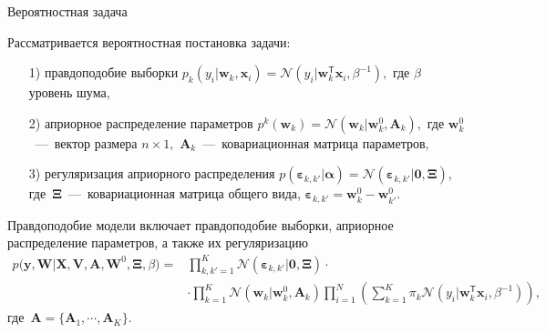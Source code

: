 \documentclass[10pt,pdf,hyperref={unicode}]{beamer}
\begin{document}
\begin{frame}{Вероятностная задача}
\justifying

Рассматривается вероятностная постановка задачи:
\begin{enumerate}
	\item[1)] правдоподобие выборки $p_{k}\left(y_{i}|\mathbf{w}_{k}, \mathbf{x}_{i}\right) = \mathcal{N}\left(y_{i}|\mathbf{w}_{k}^{\mathsf{T}}\mathbf{x}_{i}, \beta^{-1}\right),$ где $\beta$ уровень шума,
	\item[2)] априорное распределение параметров $p^{k}\left(\mathbf{w}_{k}\right) = \mathcal{N}\left(\mathbf{w}_{k}|\mathbf{w}^{0}_{k}, \mathbf{A}_{k}\right),$ где $\mathbf{w}^{0}_{k}$~---~вектор размера $n\times1,$ $\mathbf{A}_{k}$~---~ковариационная матрица параметров,
	\item[3)] регуляризация априорного распределения $p\left(\bm{\varepsilon}_{k,k'}|\bm{\alpha}\right) = \mathcal{N}\left(\bm{\varepsilon}_{k,k'}|\mathbf{0},  \bm{\Xi}\right),$ где~$\bm{\Xi}$~---~ковариационная матрица общего вида, $\bm{\varepsilon}_{k,k'} = \mathbf{w}_{k}^{0}-\mathbf{w}_{k'}^{0}.$
\end{enumerate}

Правдоподобие модели включает правдоподобие выборки, априорное распределение параметров, а также их регуляризацию
\[
\begin{aligned}
p\bigr(\mathbf{y}, \mathbf{W}|\mathbf{X}, \mathbf{V}, \textbf{A}, \textbf{W}^{0}, \bm{\Xi}, \beta\bigr) = &\prod_{k,k'=1}^{K}\mathcal{N}\left(\bm{\varepsilon}_{k,k'}|\mathbf{0},  \bm{\Xi}\right)\cdot\\
&\cdot\prod_{k=1}^{K}\mathcal{N}\left(\mathbf{w}_{k}|\mathbf{w}^{0}_{k}, \mathbf{A}_{k}\right)\prod_{i=1}^{N}\left(\sum_{k=1}^{K}\pi_{k}\mathcal{N}\left(y_{i}|\mathbf{w}_{k}^{\mathsf{T}}\mathbf{x}_{i}, \beta^{-1}\right)\right),
\end{aligned}
\]
где~$\mathbf{A} = \bigr\{\mathbf{A}_1, \cdots, \mathbf{A}_K\bigr\}.$

\end{frame}

\end{document}
